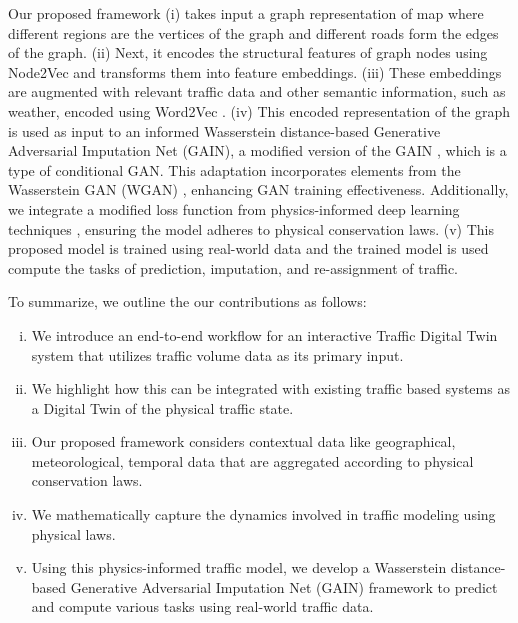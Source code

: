 Our proposed framework (i) takes input a graph representation of map where different regions are the vertices of the graph and different roads form the edges of the graph. (ii) Next, it encodes the structural features of graph nodes using Node2Vec \cite{node2vec} and  transforms them into feature embeddings. (iii) These embeddings are augmented with relevant traffic data and other semantic information, such as weather, encoded using Word2Vec \cite{word2vec}.
(iv) This encoded representation of the graph is used as input to an informed Wasserstein distance-based Generative Adversarial Imputation Net (GAIN), a modified version of the GAIN \cite{gain}, which is a type of conditional GAN. This adaptation incorporates elements from the Wasserstein GAN (WGAN) \cite{wgan}, enhancing GAN training effectiveness. Additionally, we integrate a modified loss function from physics-informed deep learning techniques \cite{pidl}, ensuring the model adheres to physical conservation laws.
(v) This proposed model is trained using real-world data and the trained model is used compute the tasks of prediction, imputation, and re-assignment of traffic.

To summarize, we outline the our contributions as follows:

\begin{enumerate}[(i)]
\item We introduce an end-to-end workflow for an interactive Traffic Digital Twin system that utilizes traffic volume data as its primary input.
\item We highlight how this can be integrated with existing traffic based systems as a Digital Twin of the physical traffic state.
\item Our proposed framework considers contextual data like geographical, meteorological, temporal data that are aggregated according to physical conservation laws.
\item We mathematically capture the dynamics involved in traffic modeling using physical laws.
\item Using this physics-informed traffic model, we develop a Wasserstein distance-based Generative Adversarial Imputation Net (GAIN) framework to predict and compute various tasks using real-world traffic data.
\end{enumerate}

